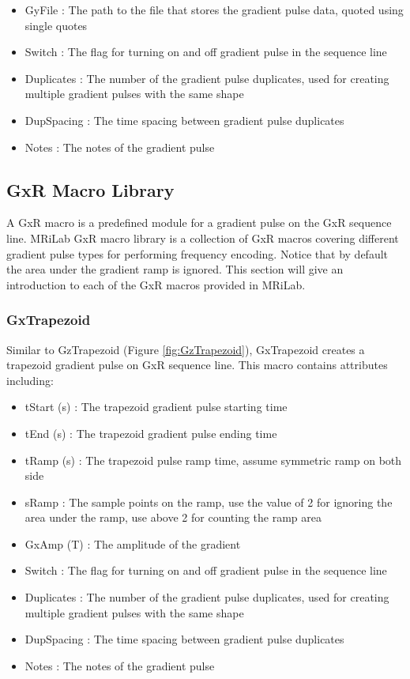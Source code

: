 \documentclass{book}%
\begin{document}
\begin{itemize}
	\item GyFile : The path to the file that stores the gradient pulse data, quoted using single quotes
	\item Switch : The flag for turning on and off gradient pulse in the sequence line
	\item Duplicates : The number of the gradient pulse duplicates, used for creating multiple gradient pulses with the same shape
	\item DupSpacing : The time spacing between gradient pulse duplicates
	\item Notes : The notes of the gradient pulse 
\end{itemize}


\subsection{GxR Macro Library}

A GxR macro is a predefined module for a gradient pulse on the GxR sequence line. MRiLab GxR macro library is a collection of GxR macros covering different gradient pulse types for performing frequency encoding. Notice that by default the area under the gradient ramp is ignored. This section will give an introduction to each of the GxR macros provided in MRiLab.

\subsubsection{GxTrapezoid}

Similar to GzTrapezoid (Figure \ref{fig:GzTrapezoid}), GxTrapezoid creates a trapezoid gradient pulse on GxR sequence line. This macro contains attributes including:

\begin{itemize}
	\item tStart (s) : The trapezoid gradient pulse starting time
	\item tEnd (s) : The trapezoid gradient pulse ending time
	\item tRamp (s) : The trapezoid pulse ramp time, assume symmetric ramp on both side
	\item sRamp : The sample points on the ramp, use the value of 2 for ignoring the area under the ramp, use above 2 for counting the ramp area
	\item GxAmp (T) : The amplitude of the gradient
	\item Switch : The flag for turning on and off gradient pulse in the sequence line
	\item Duplicates : The number of the gradient pulse duplicates, used for creating multiple gradient pulses with the same shape
	\item DupSpacing : The time spacing between gradient pulse duplicates
	\item Notes : The notes of the gradient pulse 
\end{itemize}
\end{document}
